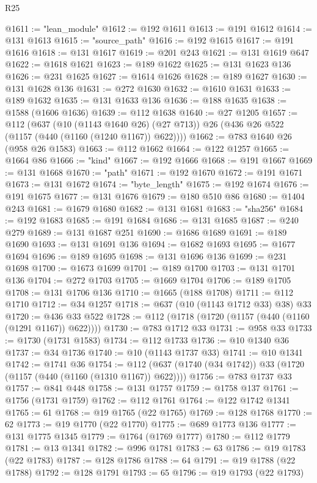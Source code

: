 \begin{lexlean}{R25}
\begin{coremodule}
{{{{{{{{{{{{{{{{{{{{{{{{{{{{{{{{{{{{{{{{{{{{{{{{{{{{{{{{{{{{{{{{{{{{{{{{{{{{{{{{{{{{{{{{{{{{{{{{{{{{{{{{{{{{{{{{{{{{{{{{{{{{{{{{{{{{{{{{{{{{{{{{{{{{{{{{{{{{{{{{{{{{{{{{{{{{{{{{{{{{{{{{{{{{{{{{{{{{{{{@1611 := "lean_module"
@1612 := @192 @1611
@1613 := @191 @1612
@1614 := @131 @1613
@1615 := "source_path"
@1616 := @192 @1615
@1617 := @191 @1616
@1618 := @131 @1617
@1619 := @201 @243
@1621 := @131 @1619 @647
@1622 := @1618 @1621
@1623 := @189 @1622
@1625 := @131 @1623 @136
@1626 := @231 @1625
@1627 := @1614 @1626
@1628 := @189 @1627
@1630 := @131 @1628 @136
@1631 := @272 @1630
@1632 := @1610 @1631
@1633 := @189 @1632
@1635 := @131 @1633 @136
@1636 := @188 @1635
@1638 := @1588 (@1606 @1636)
@1639 := @112 @1638
@1640 := @27 @1205
@1657 := @112
    (@637
      (@10 (@1143 @1640 @26) (@27 @713))
      @26
      (@436 @26 @522 (@1157 (@440 (@1160 (@1240 @1167)) @622))))
@1662 := @783 @1640 @26 (@958 @26 @1583)
@1663 := @112 @1662
@1664 := @122 @1257
@1665 := @1664 @86
@1666 := "kind"
@1667 := @192 @1666
@1668 := @191 @1667
@1669 := @131 @1668
@1670 := "path"
@1671 := @192 @1670
@1672 := @191 @1671
@1673 := @131 @1672
@1674 := "byte_length"
@1675 := @192 @1674
@1676 := @191 @1675
@1677 := @131 @1676
@1679 := @180 @510 @86
@1680 := @1404 @243
@1681 := @1679 @1680
@1682 := @131 @1681
@1683 := "sha256"
@1684 := @192 @1683
@1685 := @191 @1684
@1686 := @131 @1685
@1687 := @240 @279
@1689 := @131 @1687 @251
@1690 := @1686 @1689
@1691 := @189 @1690
@1693 := @131 @1691 @136
@1694 := @1682 @1693
@1695 := @1677 @1694
@1696 := @189 @1695
@1698 := @131 @1696 @136
@1699 := @231 @1698
@1700 := @1673 @1699
@1701 := @189 @1700
@1703 := @131 @1701 @136
@1704 := @272 @1703
@1705 := @1669 @1704
@1706 := @189 @1705
@1708 := @131 @1706 @136
@1710 := @1665 (@188 @1708)
@1711 := @112 @1710
@1712 := @34 @1257
@1718 := @637 (@10 (@1143 @1712 @33) @38) @33
@1720 := @436 @33 @522
@1728 := @112 (@1718 (@1720 (@1157 (@440 (@1160 (@1291 @1167)) @622))))
@1730 := @783 @1712 @33
@1731 := @958 @33
@1733 := @1730 (@1731 @1583)
@1734 := @112 @1733
@1736 := @10 @1340 @36
@1737 := @34 @1736
@1740 := @10 (@1143 @1737 @33)
@1741 := @10 @1341
@1742 := @1741 @36
@1754 := @112 (@637 (@1740 (@34 @1742)) @33 (@1720 (@1157 (@440 (@1160 (@1310 @1167)) @622))))
@1756 := @783 @1737 @33
@1757 := @841 @448
@1758 := @131 @1757
@1759 := @1758 @137
@1761 := @1756 (@1731 @1759)
@1762 := @112 @1761
@1764 := @122 @1742 @1341
@1765 := 61
@1768 := @19 @1765 (@22 @1765)
@1769 := @128 @1768
@1770 := 62
@1773 := @19 @1770 (@22 @1770)
@1775 := @689 @1773 @136
@1777 := @131 @1775 @1345
@1779 := @1764 (@1769 @1777)
@1780 := @112 @1779
@1781 := @13 @1341
@1782 := @996 @1781
@1783 := 63
@1786 := @19 @1783 (@22 @1783)
@1787 := @128 @1786
@1788 := 64
@1791 := @19 @1788 (@22 @1788)
@1792 := @128 @1791
@1793 := 65
@1796 := @19 @1793 (@22 @1793)
}}}}}}}}}}}}}}}}}}}}}}}}}}}}}}}}}}}}}}}}}}}}}}}}}}}}}}}}}}}}}}}}}}}}}}}}}}}}}}}}}}}}}}}}}}}}}}}}}}}}}}}}}}}}}}}}}}}}}}}}}}}}}}}}}}}}}}}}}}}}}}}}}}}}}}}}}}}}}}}}}}}}}}}}}}}}}}}}}}}}}}}}}}}}}}}}}}}}}}}
\end{coremodule}
\end{lexlean}
